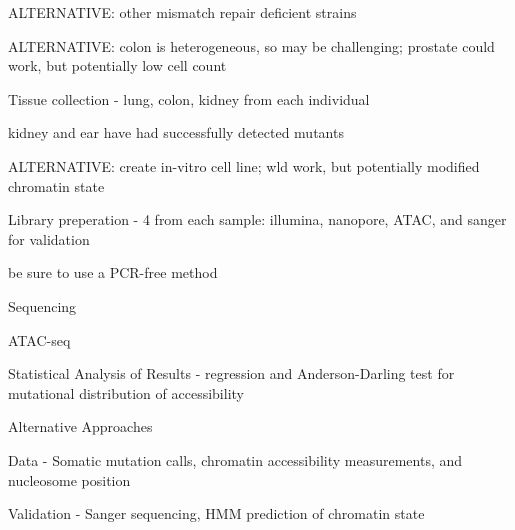 \begin{outline}
\begin{outline}
\begin{outline}
				\begin{outline}
					\item ALTERNATIVE: other mismatch repair deficient strains \parencite{wei_mouse_2002}
					\item ALTERNATIVE: colon is heterogeneous, so may be challenging; prostate could work, but potentially low cell count \parencite{behjati_genome_2014}
				\end{outline}
				\item Tissue collection - lung, colon, kidney from each individual
				\begin{outline}
					\item kidney and ear have had successfully detected mutants \parencite{turker_autosomal_2003}
					\item ALTERNATIVE: create in-vitro cell line; wld work, but potentially modified chromatin state \parencite{behjati_genome_2014}
				\end{outline}
				\item Library preperation - 4 from each sample: illumina, nanopore, ATAC, and sanger for validation
				\begin{outline}
					\item be sure to use a PCR-free method
				\end{outline}
				\item Sequencing
				\item ATAC-seq
				\item Statistical Analysis of Results - regression and Anderson-Darling test for mutational distribution of accessibility
				\item Alternative Approaches
				\item Data - Somatic mutation calls, chromatin accessibility measurements, and nucleosome position
				\item Validation - Sanger sequencing, HMM prediction of chromatin state
			\end{outline}
	\end{outline}
\end{outline}
\medskip

\printbibliography














